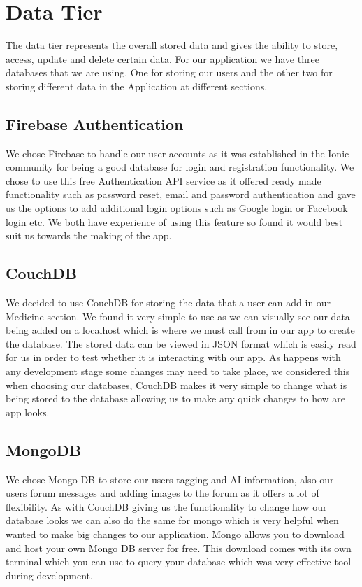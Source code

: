 \documentclass[12pt,a4paper,oneside,openany]{book}
\begin{document}
\section{Data Tier}
The data tier represents the overall stored data and gives the ability to store, access, update and delete certain data. For our application we have three databases that we are using. One for storing our users and the other two for storing different data in the Application at different sections.

\subsection{Firebase Authentication}
We chose Firebase to handle our user accounts as it was established in the Ionic community for being a good database for login and registration functionality. We chose to use this free Authentication API service as it offered ready made functionality such as password reset, email and password authentication and gave us the options to add additional login options such as Google login or Facebook login etc. We both have experience of using this feature so found it would best suit us towards the making of the app.

\subsection{CouchDB}
We decided to use CouchDB for storing the data that a user can add in our Medicine section. We found it very simple to use as we can visually see our data being added on a localhost which is where we must call from in our app to create the database. The stored data can be viewed in JSON format which is easily read for us in order to test whether it is interacting with our app. As happens with any development stage some changes may need to take place, we considered this when choosing our databases, CouchDB makes it very simple to change what is being stored to the database allowing us to make any quick changes to how are app looks.

\subsection{MongoDB}
We chose Mongo DB to store our users tagging and AI information, also our users forum messages and adding images to the forum as it offers a lot of flexibility. As with CouchDB giving us the functionality to change how our database looks we can also do the same for mongo which is very helpful when wanted to make big changes to our application. Mongo allows you to download and host your own Mongo DB server for free. This download comes with its own terminal which you can use to query your database which was very effective tool during development.
\end{document}
